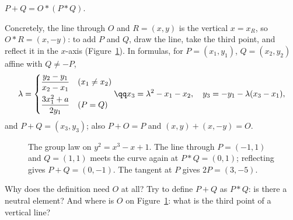 \begin{definition}
$P+Q=O*(P*Q)$.
\end{definition}

Concretely, the line through $O$ and $R=(x,y)$ is the vertical $x=x_R$, so $O*R=(x,-y)$: to add $P$ and $Q$, draw the line, take the third point, and
reflect it in the $x$-axis (Figure~\ref{fig:chord}). In formulas, for $P=(x_1,y_1)$, $Q=(x_2,y_2)$ affine with $Q\ne-P$,
\begin{equation}\label{eq:addformula}
\begin{gathered}
\lambda=\begin{cases}\dfrac{y_2-y_1}{x_2-x_1}&(x_1\ne x_2)\\[2ex]\dfrac{3x_1^2+a}{2y_1}&(P=Q)\end{cases}\qq
x_3=\lambda^2-x_1-x_2,\quad y_3=-y_1-\lambda(x_3-x_1),
\end{gathered}
\end{equation}
and $P+Q=(x_3,y_3)$; also $P+O=P$ and $(x,y)+(x,-y)=O$.

\begin{figure}[ht]
\centering{}
\caption{The group law on $y^2=x^3-x+1$. The line through $P=(-1,1)$ and $Q=(1,1)$ meets the curve again at $P*Q=(0,1)$; reflecting gives
$P+Q=(0,-1)$. The tangent at $P$ gives $2P=(3,-5)$.}
\label{fig:chord}
\end{figure}

\begin{think}
Why does the definition need $O$ at all? Try to define $P+Q$ as $P*Q$: is there a neutral element? And where is $O$ on Figure~\ref{fig:chord}: what
is the third point of a vertical line?
\end{think}

